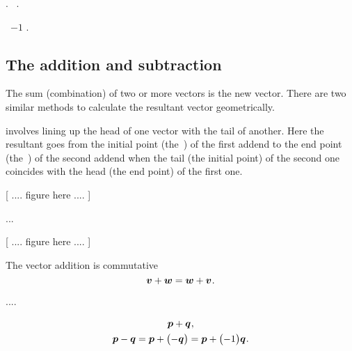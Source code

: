 \ru{,}
.
\ru{,}
~.

~${ -1}$
\ru{,}
.

\subsection{The addition and subtraction}

The sum (combination) of two or more vectors is the new  vector.
There are two similar methods to calculate the resultant vector geometrically.

\emph{}
involves lining up the head of one vector with the tail of another.
Here the resultant goes
from the initial point (the~)
of the first addend
to the end point (the~)
of the second addend
when
the tail (the initial point)
of the second one
coincides with
the head (the end point)
of the first one.

[ .... figure here .... ]

\emph{} ...

[ .... figure here .... ]

The vector addition is commutative
\begin{equation*}
\bm{v} + \bm{w} = \bm{w} + \bm{v}
\hspace{.1ex} .
\end{equation*}


....


\nopagebreak\vspace{-0.1em}\begin{gather*}
\bm{p} + \bm{q}
\hspace{.1ex} ,
\\
\bm{p} - \bm{q} = \bm{p} + \bigl( - \bm{q} \bigr)
= \bm{p} + \bigl( - 1 \bigr) \bm{q}
\hspace{.1ex} .
\end{gather*}

